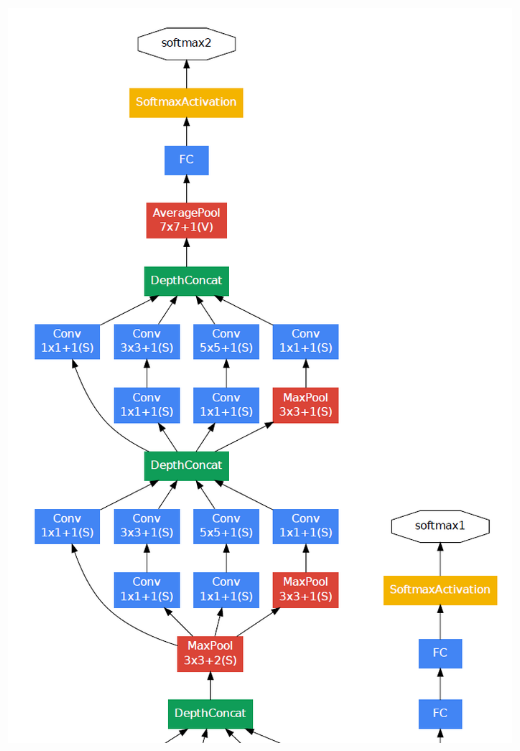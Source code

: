 \begin{frame}[allowframebreaks]
\begin{columns}
		
		\begin{column}{.4\textwidth}
		\begin{center}
			\includegraphics[scale=0.5]{figs/GoogleNet_scheme_3}
		\end{center}
		\end{column}%
	\end{columns}
	
	
	


	

\end{frame}

